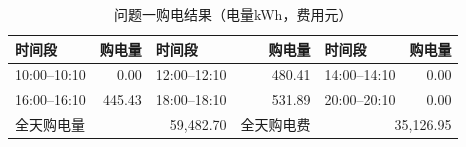 \begin{table}[H]\centering\small\setlength{\tabcolsep}{4pt}\caption{问题一购电结果（电量kWh，费用元）}
\label{tab:q1buy}\begin{tabular}{lr lr lr}\toprule
时间段 & 购电量 & 时间段 & 购电量 & 时间段 & 购电量\\\midrule
10:00--10:10 & 0.00 & 12:00--12:10 & 480.41 & 14:00--14:10 & 0.00\\
16:00--16:10 & 445.43 & 18:00--18:10 & 531.89 & 20:00--20:10 & 0.00\\
\midrule
全天购电量 & \multicolumn{2}{r}{59,482.70} & 全天购电费 & \multicolumn{2}{r}{35,126.95}\\
\bottomrule\end{tabular}\end{table}
